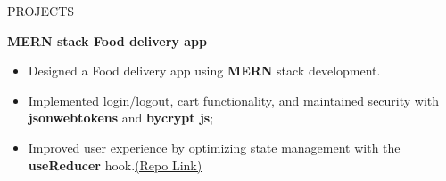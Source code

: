 \documentclass{resume} %
\begin{document}
\begin{rSection}{PROJECTS}



 

\item \textbf{MERN stack Food delivery app} 
\begin{itemize}
\vspace{-0.5em}
    \item Designed a Food delivery app using \textbf{MERN} stack development.
    \vspace{-0.5em}
    \item Implemented login/logout, cart functionality, and maintained security with \textbf{jsonwebtokens} and \textbf{bycrypt js}; 
    \vspace{-0.5em}
    \item Improved user experience by optimizing state management with the \textbf{useReducer} hook.\href{https://github.com/MulyaP/MERN-Stack-Food-Delivery-app}{(Repo Link)}
    \vspace{-0.5em}
\end{itemize}









\end{rSection}
\end{document}
